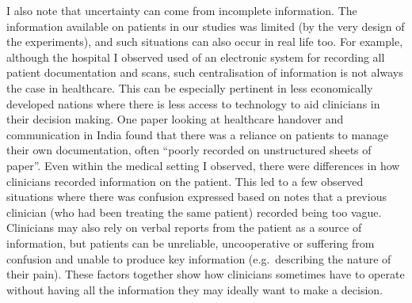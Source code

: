 \documentclass[a4paper, nobind]{templates/ociamthesis}
\begin{document}
\hfill\break
I also note that uncertainty can come from incomplete information. The information available on patients in our studies was limited (by the very design of the experiments), and such situations can also occur in real life too. For example, although the hospital I observed used of an electronic system for recording all patient documentation and scans, such centralisation of information is not always the case in healthcare. This can be especially pertinent in less economically developed nations where there is less access to technology to aid clinicians in their decision making. One paper looking at healthcare handover and communication in India \autocite{humphries_investigating_2018} found that there was a reliance on patients to manage their own documentation, often ``poorly recorded on unstructured sheets of paper''. Even within the medical setting I observed, there were differences in how clinicians recorded information on the patient. This led to a few observed situations where there was confusion expressed based on notes that a previous clinician (who had been treating the same patient) recorded being too vague. Clinicians may also rely on verbal reports from the patient as a source of information, but patients can be unreliable, uncooperative or suffering from confusion and unable to produce key information (e.g.~describing the nature of their pain). These factors together show how clinicians sometimes have to operate without having all the information they may ideally want to make a decision.
\end{document}
